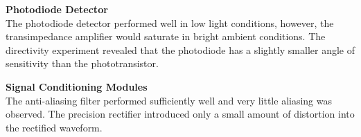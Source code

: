 \textbf{Photodiode Detector}\\
The photodiode detector performed well in low light conditions, however, the transimpedance amplifier would saturate in bright ambient conditions. The directivity experiment revealed that the photodiode has a slightly smaller angle of sensitivity than the phototransistor.

\textbf{Signal Conditioning Modules}\\
The anti-aliasing filter performed sufficiently well and very little aliasing was observed. The precision rectifier introduced only a small amount of distortion into the rectified waveform.
















